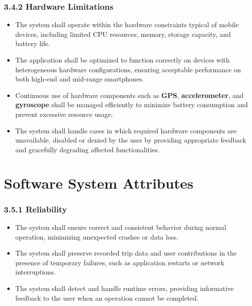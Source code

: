 \subsubsection{3.4.2 Hardware Limitations}
\begin{itemize}
    \item The system shall operate within the hardware constraints typical of mobile devices, including limited CPU resources, memory, storage capacity, and battery life.
    
    \item The application shall be optimized to function correctly on devices with heterogeneous hardware configurations, ensuring acceptable performance on both high-end and mid-range smartphones.
    
    \item Continuous use of hardware components such as \textbf{GPS}, \textbf{accelerometer}, and \textbf{gyroscope} shall be managed efficiently to minimize battery consumption and prevent excessive resource usage.
    
    \item The system shall handle cases in which required hardware components are unavailable, disabled or denied by the user by providing appropriate feedback and gracefully degrading affected functionalities.
\end{itemize}


\section{Software System Attributes}

\subsubsection{3.5.1 Reliability}
\begin{itemize}
    \item The system shall ensure correct and consistent behavior during normal operation, minimizing unexpected crashes or data loss.
    
    \item The system shall preserve recorded trip data and user contributions in the presence of temporary failures, such as application restarts or network interruptions.
    
    \item The system shall detect and handle runtime errors, providing informative feedback to the user when an operation cannot be completed.
\end{itemize}

